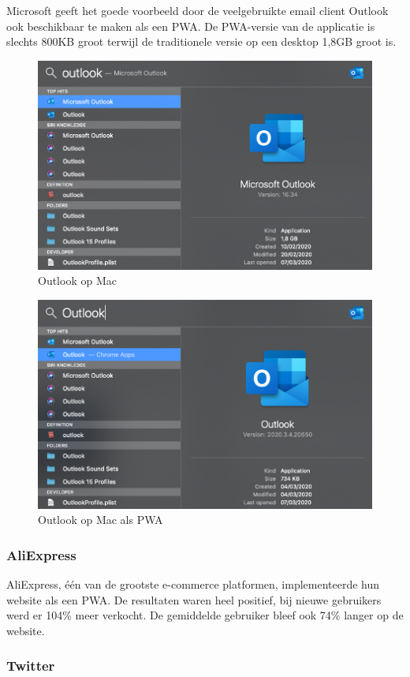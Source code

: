 Microsoft geeft het goede voorbeeld door de veelgebruikte email client Outlook ook beschikbaar te maken als een PWA.
De PWA-versie van de applicatie is slechts 800KB groot terwijl de traditionele versie op een desktop 1,8GB groot is.
\begin{figure}
	\includegraphics{./img/Outlook_native.png}
	\caption{Outlook op Mac}
\end{figure}

\begin{figure}
	\includegraphics{./img/Outlook_pwa.png}
	\caption{Outlook op Mac als PWA}
\end{figure}
\subsubsection{AliExpress}

AliExpress, één van de grootste e-commerce platformen, implementeerde hun website als een PWA. De resultaten waren heel positief, bij nieuwe gebruikers werd er 104\% meer verkocht. De gemiddelde gebruiker bleef ook 74\% langer op de website.

\autocite{Developers2020}


\subsubsection{Twitter}

